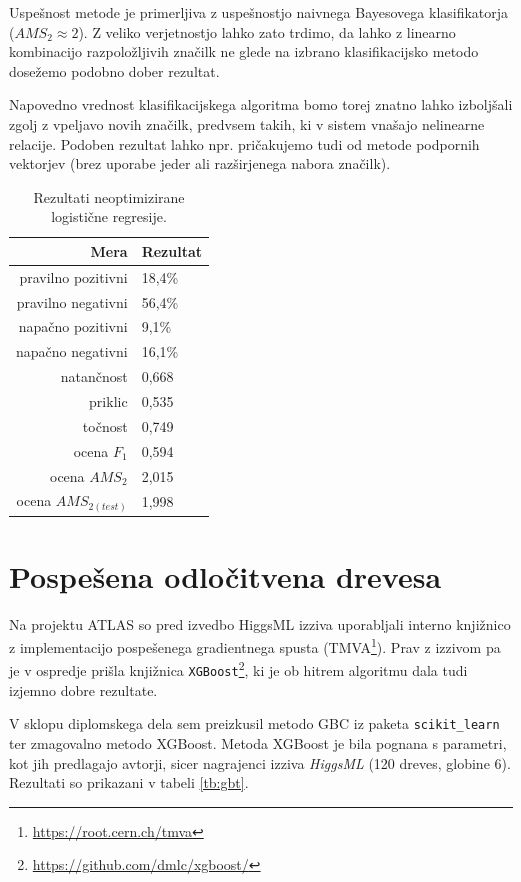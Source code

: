 \documentclass[11pt,a4paper,openany]{book}
\begin{document}
Uspešnost metode je primerljiva z uspešnostjo naivnega Bayesovega klasifikatorja ($AMS_2 \approx 2$). Z veliko verjetnostjo lahko zato trdimo, da lahko z linearno kombinacijo razpoložljivih značilk ne glede na izbrano klasifikacijsko metodo dosežemo podobno dober rezultat.

Napovedno vrednost klasifikacijskega algoritma bomo torej znatno lahko izboljšali zgolj z vpeljavo novih značilk, predvsem takih, ki v sistem vnašajo nelinearne relacije. Podoben rezultat lahko npr. pričakujemo tudi od metode podpornih vektorjev (brez uporabe jeder ali razširjenega nabora značilk).

\begin{table}[h!]
	\centering
	\begin{tabular}{rl}
		\hline
		\textbf{Mera} & \textbf{Rezultat} \\
		\hline
		pravilno pozitivni & 18,4\%\\
		pravilno negativni & 56,4\% \\
		napačno pozitivni & 9,1\% \\
		napačno negativni & 16,1\% \\
		natančnost & 0,668 \\
		priklic & 0,535 \\
		točnost & 0,749 \\
		ocena $F_1$ & 0,594 \\
		ocena $AMS_2$ & 2,015 \\
		ocena $AMS_{2(test)}$ & 1,998 		
	\end{tabular}
	\caption{Rezultati neoptimizirane logistične regresije.}
	\label{tb:logisticna}
\end{table}


\section{Pospešena odločitvena drevesa}

Na projektu ATLAS so pred izvedbo HiggsML izziva uporabljali interno knjižnico z implementacijo pospešenega gradientnega spusta (TMVA\footnote{\url{https://root.cern.ch/tmva}}). Prav z izzivom pa je v ospredje prišla knjižnica \texttt{XGBoost}\footnote{\url{https://github.com/dmlc/xgboost/}}, ki je ob hitrem algoritmu dala tudi izjemno dobre rezultate.

V sklopu diplomskega dela sem preizkusil metodo GBC iz paketa \texttt{scikit\_learn} ter zmagovalno metodo XGBoost. Metoda XGBoost je bila pognana s parametri, kot jih predlagajo avtorji, sicer nagrajenci izziva \textit{HiggsML} (120 dreves, globine 6). Rezultati so prikazani v tabeli \ref{tb:gbt}.
\end{document}
